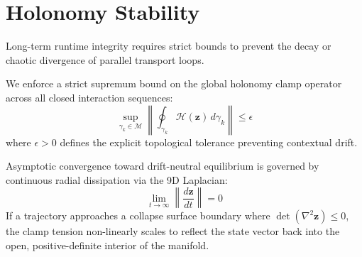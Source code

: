 \section{Holonomy Stability}
\label{sec:holonomy-stability}

Long-term runtime integrity
requires strict bounds to prevent
the decay or chaotic divergence
of parallel transport loops.

We enforce a strict supremum
bound on the global holonomy
clamp operator across all closed
interaction sequences:
\[
\sup_{\gamma_k \in \mathcal{M}}
\left\| \oint_{\gamma_k}
\mathcal{H}(\mathbf{z}) \,
d\gamma_k \right\| \le \epsilon
\]
where $\epsilon > 0$ defines
the explicit topological tolerance
preventing contextual drift.

Asymptotic convergence toward
drift-neutral equilibrium is
governed by continuous radial
dissipation via the 9D Laplacian:
\[
\lim_{t \to \infty}
\left\| \frac{d\mathbf{z}}{dt}
\right\| = 0
\]
If a trajectory approaches
a collapse surface boundary
where $\det(\nabla^2 \mathbf{z}) \le 0$,
the clamp tension non-linearly
scales to reflect the state vector
back into the open, positive-definite
interior of the manifold.
